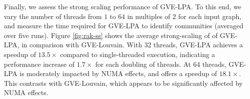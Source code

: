 Finally, we assess the strong scaling performance of GVE-LPA. To this end, we vary the number of threads from $1$ to $64$ in multiples of $2$ for each input graph, and measure the time required for GVE-LPA to identify communities (averaged over five runs). Figure \ref{fig:rak-ss} shows the average strong-scaling of of GVE-LPA, in comparison with GVE-Louvain. With 32 threads, GVE-LPA achieves a speedup of $13.5\times$ compared to single-threaded execution, indicating a performance increase of $1.7\times$ for each doubling of threads. At 64 threads, GVE-LPA is moderately impacted by NUMA effects, and offers a speedup of $18.1\times$. This contrasts with GVE-Louvain, which appears to be significantly affected by NUMA effects.
